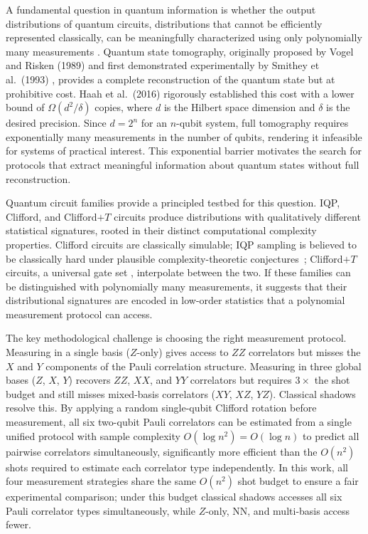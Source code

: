 \documentclass[conference]{IEEEtran}
\newcommand{\nqubits}{n}
\begin{document}
A fundamental question in quantum information is whether the output distributions of quantum circuits, distributions that cannot be efficiently represented classically, can be meaningfully characterized using only polynomially many measurements \cite{montanaro2013survey}. 
Quantum state tomography, originally proposed by Vogel and Risken (1989) \cite{vogel1989determination} and first demonstrated experimentally by Smithey et al.\ (1993) \cite{smithey1993measurement}, provides a complete reconstruction of the quantum state but at prohibitive cost. 
Haah et al.\ (2016) \cite{haah2016sample} rigorously established this cost with a lower bound of $\Omega(d^2/\delta)$ copies, where $d$ is the Hilbert space dimension and $\delta$ is the desired precision. 
Since $d = 2^n$ for an $n$-qubit system, full tomography requires exponentially many measurements in the number of qubits, rendering it infeasible for systems of practical interest. 
This exponential barrier motivates the search for protocols that extract meaningful information about quantum states without full reconstruction.

Quantum circuit families provide a principled testbed for this question.
IQP, Clifford, and Clifford$+T$ circuits produce distributions with qualitatively different statistical signatures, rooted in their distinct computational complexity properties.
Clifford circuits are classically simulable; IQP sampling is believed to be classically hard under plausible complexity-theoretic conjectures~\cite{bremner2016average}; Clifford$+T$ circuits, a universal gate set \cite{boykin1999universal, bravyi2005universal}, interpolate between the two.
If these families can be distinguished with polynomially many measurements, it suggests that their distributional signatures are encoded in low-order statistics that a polynomial measurement protocol can access.

The key methodological challenge is choosing the right measurement protocol.
Measuring in a single basis ($Z$-only) gives access to $ZZ$ correlators but misses the $X$ and $Y$ components of the Pauli correlation structure.
Measuring in three global bases ($Z$, $X$, $Y$) recovers $ZZ$, $XX$, and $YY$ correlators but requires $3\times$ the shot budget and still misses mixed-basis correlators ($XY$, $XZ$, $YZ$).
Classical shadows resolve this. By applying a random single-qubit Clifford rotation before measurement, all six 
two-qubit Pauli correlators can be estimated from a single unified protocol with sample complexity 
$O(\log n^2) = O(\log n)$ to predict all pairwise correlators simultaneously, significantly more efficient 
than the $O(n^2)$ shots required to estimate each correlator type independently.
In this work, all four measurement strategies share the same $O(\nqubits^2)$ shot budget to ensure a fair experimental comparison; under this budget classical shadows accesses all six Pauli correlator types simultaneously, while $Z$-only, NN, and multi-basis access fewer.
\end{document}
